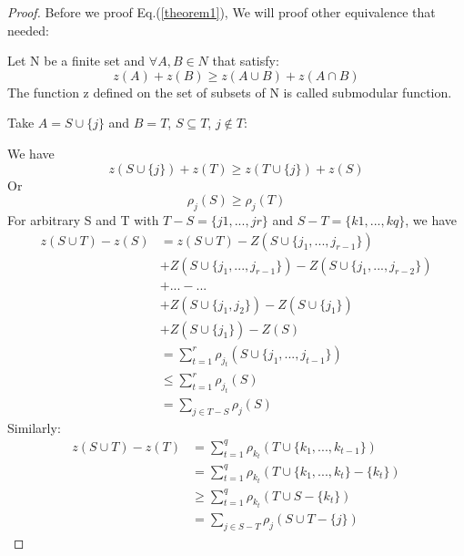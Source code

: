 \documentclass{article}
\newtheorem{proof}{Proof}[section]
\begin{document}
\begin{proof}
Before we proof Eq.(\ref{theorem1}), We will proof other equivalence that needed:
\par Let N be a finite set and $\forall A,B \in N $ that satisfy:
\begin{equation}
z(A)+z(B)\geq z(A\cup B)+z(A\cap B)
\label{submod_definition}
\end{equation} The function z defined on the set of subsets of N is called submodular function.
\par Take $A=S\cup \{j\}$ and $B=T$, $S\subseteq T$, $j\notin T$:
\par We have
\begin{equation}
z(S\cup \{j\})+z(T)\geq z(T\cup \{j\})+z(S)
\end{equation}
Or
\begin{equation}
\rho_j(S) \geq \rho_j(T)
\label{rhoST}
\end{equation}
For arbitrary S and T with $T-S = \{j1,...,jr\}$ and $S-T = \{k1,...,kq\}$, we have
\begin{equation}
\begin{split}
    z(S\cup T)-z(S) & = z(S\cup T) - Z(S\cup \{j_1,...,j_{r-1}\}) \\
                    & + Z(S\cup \{j_1,...,j_{r-1}\})- Z(S\cup \{j_1,...,j_{r-2}\}) \\
                    & + ... - ... \\
                    & + Z(S\cup \{j_1,j_2\}) - Z(S\cup \{j_1\}) \\
                    & + Z(S\cup \{j_1\}) - Z(S) \\
                    & = \sum_{t=1}^{r}\rho_{j_t}(S\cup \{j_1,...,j_{t-1}\}) \\
                    & \leq \sum_{t=1}^{r}\rho_{j_t}(S) \\
                    & = \sum_{j\in T-S}\rho_{j}(S)
\end{split}
\label{7}
\end{equation}
Similarly:
\begin{equation}
\begin{split}
    z(S\cup T)-z(T)& =\sum_{t=1}^{q}\rho_{k_t}(T\cup \{k_1,...,k_{t-1}\})\\
                    & =\sum_{t=1}^{q}\rho_{k_t}(T\cup \{k_1,...,k_{t}\}-\{k_t\})\\
                    & \geq \sum_{t=1}^{q}\rho_{k_t}(T\cup S-\{k_t\})\\
                    & = \sum_{j\in S-T}\rho_{j}(S\cup T - \{j\})
\end{split}

\end{equation}
\end{proof}
\end{document}
